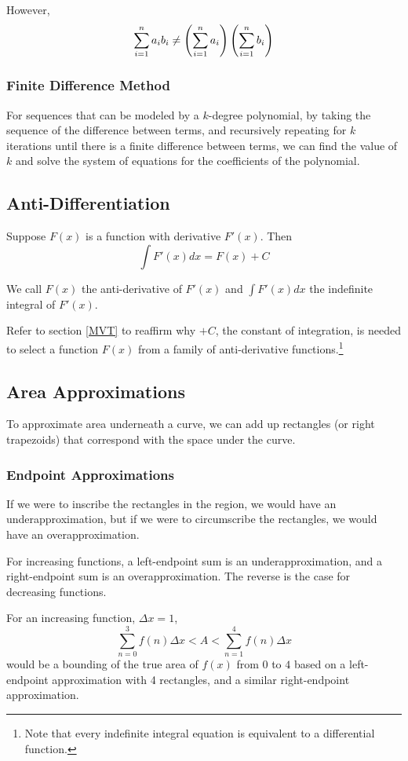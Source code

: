 \documentclass{article}
\begin{document}
However, $$\sum_{i=1}^{n}\limits a_ib_i \ne \left(\sum_{i=1}^{n}\limits a_i\right)\left(\sum_{i=1}^{n}\limits b_i\right)$$

\subsubsection{Finite Difference Method}
For sequences that can be modeled by a $k$-degree polynomial, by taking the sequence of the difference between terms, and recursively repeating for $k$ iterations until there is a finite difference between terms, we can find the value of $k$ and solve the system of equations for the coefficients of the polynomial.

\subsection{Anti-Differentiation}
Suppose $F(x)$ is a function with derivative $F'(x)$. Then $$\int F'(x)dx = F(x) + C$$

We call $F(x)$ the anti-derivative of $F'(x)$ and $\int F'(x)dx$ the indefinite integral of $F'(x)$.

Refer to section \ref{MVT} to reaffirm why $+C$, the constant of integration, is needed to select a function $F(x)$ from a family of anti-derivative functions.\footnote{Note that every indefinite integral equation is equivalent to a differential function.}

\subsection{Area Approximations}
To approximate area underneath a curve, we can add up rectangles (or right trapezoids) that correspond with the space under the curve.

\subsubsection{Endpoint Approximations}
If we were to inscribe the rectangles in the region, we would have an underapproximation, but if we were to circumscribe the rectangles, we would have an overapproximation.

For increasing functions, a left-endpoint sum is an underapproximation, and a right-endpoint sum is an overapproximation. The reverse is the case for decreasing functions.

For an increasing function, $\Delta x = 1$, $$\sum_{n=0}^{3} f(n) \Delta x < A < \sum_{n=1}^{4} f(n) \Delta x$$ would be a bounding of the true area of $f(x)$ from $0$ to $4$ based on a left-endpoint approximation with 4 rectangles, and a similar right-endpoint approximation.
\end{document}

